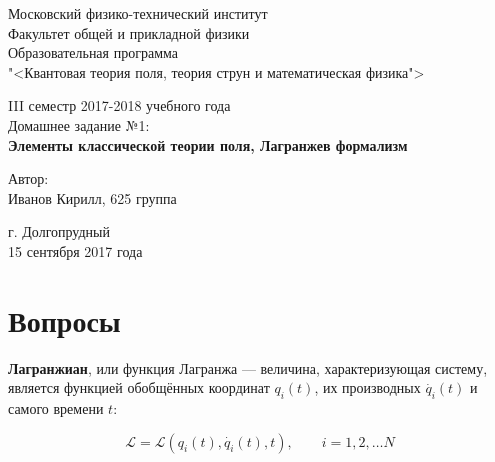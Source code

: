 \documentclass[12pt]{kiarticle}
\newcommand{\Ll}{\ensuremath{\mathcal{L}}}
\begin{document}
\begin{titlepage}		
	\begin{center}
		\large 	Московский физико-технический институт \\
		Факультет общей и прикладной физики \\
		\vspace{0.2cm}
		Образовательная программа\\
		"<Квантовая теория поля, теория струн и математическая физика">
		
		\vspace{4.5cm}
		III семестр 2017-2018 учебного года \\ \vspace{0.1cm}
		\large Домашнее задание №1: \\ \vspace{0.1cm}
		\LARGE \textbf{Элементы классической теории поля, Лагранжев формализм}
	\end{center}
	\vspace{2.3cm} \large
	
	\begin{center}
		Автор: \\
		Иванов Кирилл,
		625 группа
		\vspace{10mm}
		
		
	\end{center}
	
	\begin{center} \vspace{50mm}
		г. Долгопрудный \\ 
		15 сентября 2017 года
	\end{center}
\end{titlepage}



%
%
%
%

\section{Вопросы}


\textbf{Лагранжиан}, или функция Лагранжа --- величина, характеризующая систему,  является функцией обобщённых координат $ q_i(t) $, их производных $ \dot{q_i}(t) $ и самого времени $ t $:

\begin{equation}\label{}
\Ll = \Ll \left( q_i(t), \dot{q_i}(t), t\right) , \qquad i = 1, 2, \ldots N
\end{equation}
\end{document}
